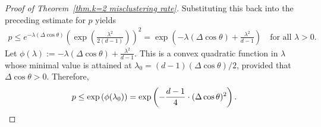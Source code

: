 \documentclass{article}
\theoremstyle{plain}
\theoremstyle{definition}
\newcommand{\1}{\mathbf{1}}
\begin{document}
\begin{proof}[Proof of Theorem~\ref{thm.k=2 misclustering rate}]
Substituting this back into the preceding estimate for $p$ yields 
\begin{align*}
    p \le e^{-\lambda(\Delta\cos\theta)} \left( \exp\left(
    \frac{\lambda^2}{2(d-1)}
    \right)
    \right)^2 = \exp\left(
        -\lambda(\Delta\cos\theta) + \frac{\lambda^2}{d-1}
    \right)\quad \text{for all }\lambda>0.
\end{align*}  Let $\phi(\lambda) := -\lambda(\Delta\cos\theta) + \frac{\lambda^2}{d-1}$. This is a convex quadratic function in $\lambda$ whose minimal value is attained at $\lambda_0 = (d-1)(\Delta\cos\theta)/2 $, provided that $\Delta\cos\theta>0$. Therefore, 
\[
p    \le \exp\left(
    \phi(\lambda_0)
 \right)
    = \exp\left(
    -\frac{d-1}{4}\cdot (\Delta\cos\theta)^2
 \right).
\qedhere
\]
\end{proof}
\end{document}
